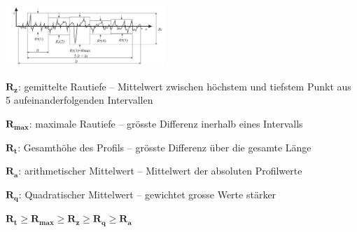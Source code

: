 
\includegraphics[width = 60mm]{src/images/rauheiten.png}
\item $\mathbf{R_{z}}$: gemittelte Rautiefe – Mittelwert zwischen höchstem und tiefstem Punkt aus 5 aufeinanderfolgenden Intervallen
\item $\mathbf{R_{max}}$: maximale Rautiefe – grösste Differenz inerhalb eines Intervalls
\item $\mathbf{R_{t}}$: Gesamthöhe des Profils – grösste Differenz über die gesamte Länge
\item $\mathbf{R_{a}}$: arithmetischer Mittelwert – Mittelwert der absoluten Profilwerte
\item $\mathbf{R_{q}}$: Quadratischer Mittelwert – gewichtet grosse Werte stärker
\begin{center}
    $\mathbf{R_{t} \geq  R_{max} \geq R_{z} \geq R_{q} \geq R_{a}}$
\end{center}
